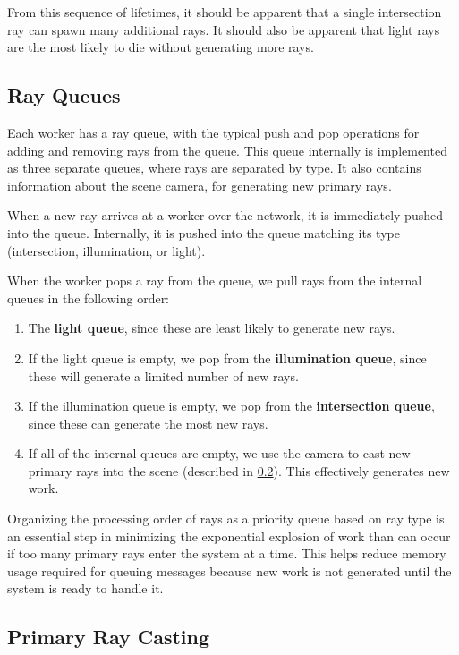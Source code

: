 \documentclass[12pt]{ucthesis}
\begin{document}
From this sequence of lifetimes, it should be apparent that a single intersection
ray can spawn many additional rays. It should also be apparent that light rays
are the most likely to die without generating more rays.

\subsection {Ray Queues}
\label{queues}

Each worker has a ray queue, with the typical push and pop operations for adding
and removing rays from the queue. This queue internally is implemented as three
separate queues, where rays are separated by type. It also contains information
about the scene camera, for generating new primary rays.

When a new ray arrives at a worker over the network, it is immediately pushed
into the queue. Internally, it is pushed into the queue matching its type
(intersection, illumination, or light).

When the worker pops a ray from the queue, we pull rays from the internal
queues in the following order:

\begin{enumerate}
   \item The \textbf{light queue}, since these are least likely to generate
      new rays.
   \item If the light queue is empty, we pop from the \textbf{illumination queue},
      since these will generate a limited number of new rays.
   \item If the illumination queue is empty, we pop from the
      \textbf{intersection queue}, since these can generate the most new rays.
   \item If all of the internal queues are empty, we use the camera to cast
      new primary rays into the scene (described in \ref{primaryrays}). This
      effectively generates new work.
\end{enumerate}

Organizing the processing order of rays as a priority queue based on ray type
is an essential step in minimizing the exponential explosion of work than can
occur if too many primary rays enter the system at a time. This helps reduce
memory usage required for queuing messages because new work is not generated
until the system is ready to handle it.

\subsection{Primary Ray Casting}
\label{primaryrays}
\end{document}
